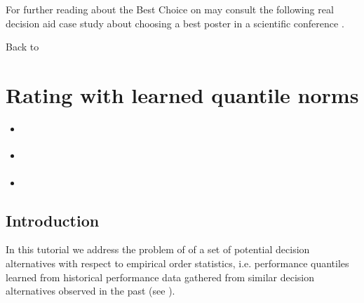 \documentclass[a4paper,12pt,english]{sphinxhowto}
\begin{document}
For further reading about the  Best Choice on may consult the following real decision aid case study about choosing a best poster in a scientific conference  .

Back to {\hyperref[\detokenize{tutorial:tutorial-label}]{}}


\section{Rating with learned quantile norms}
\label{\detokenize{tutorial:rating-with-learned-quantile-norms}}\label{\detokenize{tutorial:rating-tutorial-label}}
\begin{sphinxShadowBox}
\begin{itemize}
\item {} 
\label{\detokenize{tutorial:id211}}{\hyperref[\detokenize{tutorial:id59}]{}}

\item {} 
\label{\detokenize{tutorial:id212}}{\hyperref[\detokenize{tutorial:incremental-learning-of-historical-performance-quantiles}]{}}

\item {} 
\label{\detokenize{tutorial:id213}}{\hyperref[\detokenize{tutorial:rating-new-performances-with-quantile-norms}]{}}

\end{itemize}
\end{sphinxShadowBox}


\subsection{Introduction}
\label{\detokenize{tutorial:id59}}
In this tutorial we address the problem of  of a set of potential decision alternatives with respect to empirical order statistics, i.e. performance quantiles learned from historical performance data gathered from similar decision alternatives observed in the past (see ).
\end{document}
